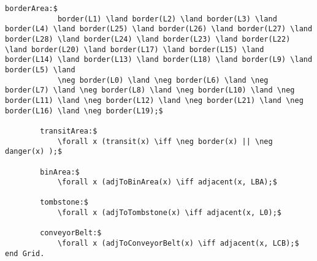 \begin{lstlisting}[fontadjust, mathescape, frame=tlb]
        borderArea:$
            border(L1) \land border(L2) \land border(L3) \land border(L4) \land border(L25) \land border(L26) \land border(L27) \land border(L28) \land border(L24) \land border(L23) \land border(L22) \land border(L20) \land border(L17) \land border(L15) \land border(L14) \land border(L13) \land border(L18) \land border(L9) \land border(L5) \land 
            \neg border(L0) \land \neg border(L6) \land \neg border(L7) \land \neg border(L8) \land \neg border(L10) \land \neg border(L11) \land \neg border(L12) \land \neg border(L21) \land \neg border(L16) \land \neg border(L19);$

        transitArea:$
            \forall x (transit(x) \iff \neg border(x) || \neg danger(x) );$

        binArea:$
            \forall x (adjToBinArea(x) \iff adjacent(x, LBA);$

        tombstone:$
            \forall x (adjToTombstone(x) \iff adjacent(x, L0);$

        conveyorBelt:$
            \forall x (adjToConveyorBelt(x) \iff adjacent(x, LCB);$
end Grid.\end{lstlisting}